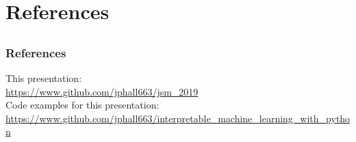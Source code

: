 \documentclass[11pt,
               aspectratio=169,
               hyperref={colorlinks}
               ]{beamer}
\begin{document}
	\section{References}

	\subsection{}

	\begin{frame}[t, allowframebreaks]
	
		\frametitle{References}	
		
			This presentation:\\
			{\url{https://www.github.com/jphall663/jsm_2019}}\\
			\vspace{10pt}
			\normalsize Code examples for this presentation:\\
			{\url{https://www.github.com/jphall663/interpretable_machine_learning_with_python}}\\
								
		\framebreak		
		
		\printbibliography
		
	\end{frame}
\end{document}

